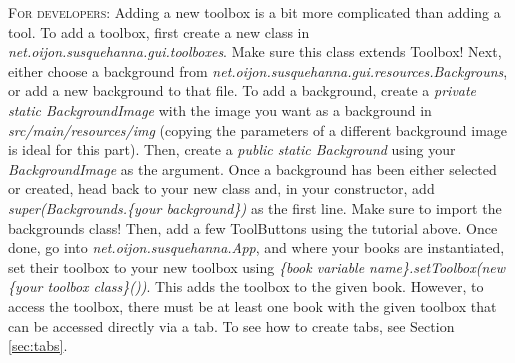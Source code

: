 \documentclass{report}
\begin{document}
	\par
	\begin{tcolorbox}[width=1\textwidth]
		\textsc{For developers:} Adding a new toolbox is a bit more complicated than adding a tool. To add a toolbox, first create a new class in \emph{net.oijon.susquehanna.gui.toolboxes}. Make sure this class extends Toolbox! Next, either choose a background from \emph{net.oijon.susquehanna.gui.resources.Backgrouns}, or add a new background to that file. To add a background, create a \emph{private static BackgroundImage} with the image you want as a background in \emph{src/main/resources/img} (copying the parameters of a different background image is ideal for this part). Then, create a \emph{public static Background} using your \emph{BackgroundImage} as the argument. Once a background has been either selected or created, head back to your new class and, in your constructor, add \emph{super(Backgrounds.\{your background\})} as the first line. Make sure to import the backgrounds class! Then, add a few ToolButtons using the tutorial above. Once done, go into \emph{net.oijon.susquehanna.App}, and where your books are instantiated, set their toolbox to your new toolbox using \emph{\{book variable name\}.setToolbox(new \{your toolbox class\}())}. This adds the toolbox to the given book. However, to access the toolbox, there must be at least one book with the given toolbox that can be accessed directly via a tab. To see how to create tabs, see Section \ref{sec:tabs}.
	\end{tcolorbox}
\end{document}
